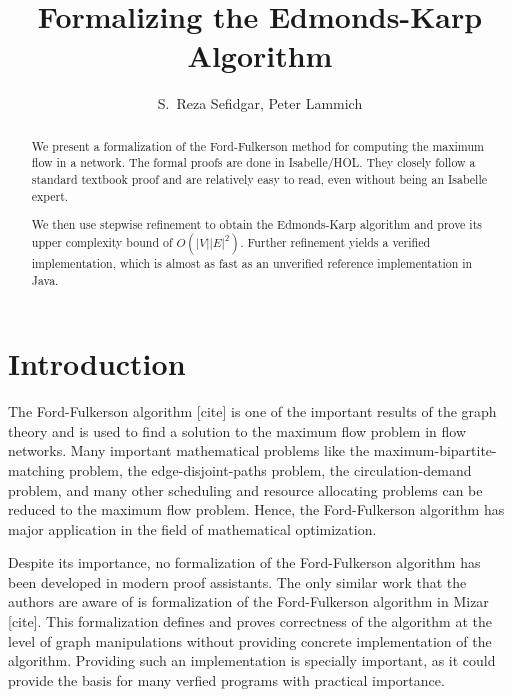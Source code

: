 \documentclass{llncs}
\begin{document}
\title{Formalizing the Edmonds-Karp Algorithm}

\author{S.~Reza Sefidgar, Peter Lammich}


\maketitle
\begin{abstract}
We present a formalization of the Ford-Fulkerson method for computing the maximum flow in a network. 
The formal proofs are done in Isabelle/HOL. They closely follow a standard textbook proof and are relatively easy 
to read, even without being an Isabelle expert.

We then use stepwise refinement to obtain the Edmonds-Karp algorithm and prove its upper complexity bound of $O(|V||E|^2)$.
Further refinement yields a verified implementation, which is almost as fast as an unverified  
reference implementation in Java. 

% 
% 
\end{abstract}

\section{Introduction}
The Ford-Fulkerson algorithm [cite] is one of the important results of the graph theory and is used to find a solution to the maximum flow problem in flow networks. Many important mathematical problems like the maximum-bipartite-matching problem, the edge-disjoint-paths problem, the circulation-demand problem, and many other scheduling and resource allocating problems can be reduced to the maximum flow problem. Hence, the Ford-Fulkerson algorithm has major application in the field of mathematical optimization.

Despite its importance, no formalization of the Ford-Fulkerson algorithm has been developed in modern proof assistants. The only similar work that the authors are aware of is formalization of the Ford-Fulkerson algorithm in Mizar [cite]. This formalization defines and proves correctness of the algorithm at the level of graph manipulations without providing concrete implementation of the algorithm. Providing such an implementation is specially important, as it could provide the basis for many verfied programs with practical importance.
\end{document}
